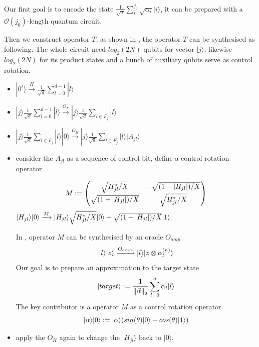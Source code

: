\documentclass[%
 reprint,
 amsmath,amssymb,
pra,
]{revtex4-1}
\begin{document}
Our first goal is to encode the state $\frac{1}
{\sqrt{\alpha}}\sum_i^{j_0}\sqrt{\alpha_i}|i\rangle$, it can be prepared with a $\mathcal{O}(j_0)$-length quantum circuit.

Then we construct operator $T$, as shown in \cite{berry2015hamiltonian}, the operator $T$ can be synthesised as following.
The whole circuit need $log_2(2N)$ qubits for vector $|j\rangle$, likewise 
$log_2(2N)$ for its product states and a bunch of auxiliary qubits serve as 
control rotation.

\begin{itemize}
\item $|0^t\rangle\xrightarrow{H}
\frac{1}{\sqrt{d}}\sum_{l=0}^{d-1}|l\rangle$
\item $|j\rangle\frac{1}{\sqrt{d}}\sum_{l=0}^{d-1}|l
\rangle\xrightarrow{O_F}|j\rangle\frac{1}{\sqrt{d}}\sum_{l\in F_j}|l
\rangle$
\item $|j\rangle\frac{1}{\sqrt{d}}\sum_{l\in F_j}|l\rangle|0\rangle
\xrightarrow{O_H}|j\rangle\frac{1}{\sqrt{d}}\sum_{l\in F_j}|l\rangle
|A_{jl}\rangle$
\item consider the $A_{jl}$ as a sequence of control bit, define a control 
rotation operator

\begin{equation}
M:=\begin{pmatrix}
\sqrt{H_{jl}^*/X} & -\sqrt{(1-|H_{jl}|)/X}\\
\sqrt{(1-|H_{jl}|)/X} &\sqrt{H_{jl}^*/X}\notag
\end{pmatrix}
\end{equation}
$|H_{jl}\rangle|0\rangle\xrightarrow{M}|H_{jl}\rangle
\sqrt{H_{jl}^*/X}|0\rangle+\sqrt{(1-|H_{jl}|)/X}|1\rangle\notag$

In \cite{PhysRevLett.122.020502}, operator $M$ can be synthesised by an oracle $O_{amp}$
\begin{equation}
|l\rangle|z\rangle\xrightarrow{O_{amp}}|l\rangle|z\otimes\alpha_l^{(n)}
\rangle\notag
\end{equation}
Our goal is to prepare an approximation to the target state
\begin{equation}
|target\rangle:=\frac{1}{{\lVert\vec{\alpha}\rVert}_2}\sum_{l=0}^n\alpha_l
|l\rangle\notag
\end{equation}
The key contributor is a operator $M$ as a control rotation operator.
\begin{equation}
|\alpha\rangle|0\rangle:=|\alpha\rangle(sin(\theta)|0\rangle+
cos(\theta)|1\rangle)\notag
\end{equation}

\item apply the $O_H$ again to change the $|H_{jl}\rangle$ back to 
$|0\rangle$.
\end{itemize}
\end{document}
